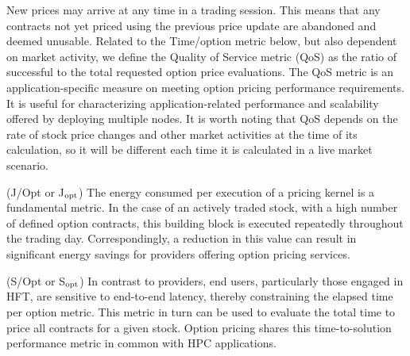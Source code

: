 \begin{description}[leftmargin=0cm]
  \item[QoS] New prices may arrive at any time in a trading 
             session. This means that any contracts not yet 
             priced using the previous price update are 
             abandoned and deemed unusable. Related to the 
             Time/option metric below, 
             but also dependent on market activity, we define 
             the Quality of Service metric (QoS) as the ratio 
             of successful to the total requested option 
             price evaluations. The QoS metric is an 
             application-specific measure on meeting 
             option pricing performance requirements. It is 
             useful for characterizing application-related 
             performance and scalability offered by deploying 
             multiple nodes. It is worth noting that QoS 
             depends on the rate of stock price changes and other 
             market activities at the time of its calculation,
             so it will be different each time it is calculated 
             in a live market scenario.
  \item[Joules/option] (J/Opt or J$_{\rm opt}$) The energy consumed per execution of a pricing kernel is
         a fundamental metric.
In the case of 
         an actively traded stock, with a high 
         number of defined option contracts, this building
         block is executed repeatedly throughout the trading day.
         Correspondingly, a reduction in this value can result in significant
         energy savings for providers offering option pricing services.
 \item[Time/option] (S/Opt or S$_{\rm opt}$)
         In contrast to providers, end users, particularly those engaged in HFT, 
         are sensitive to end-to-end latency, thereby constraining the elapsed 
         time per option metric. This metric in turn can be used to evaluate the 
         total time to price all contracts for a given stock. Option pricing 
         shares this time-to-solution performance metric in common with HPC applications. 
\end{description}
